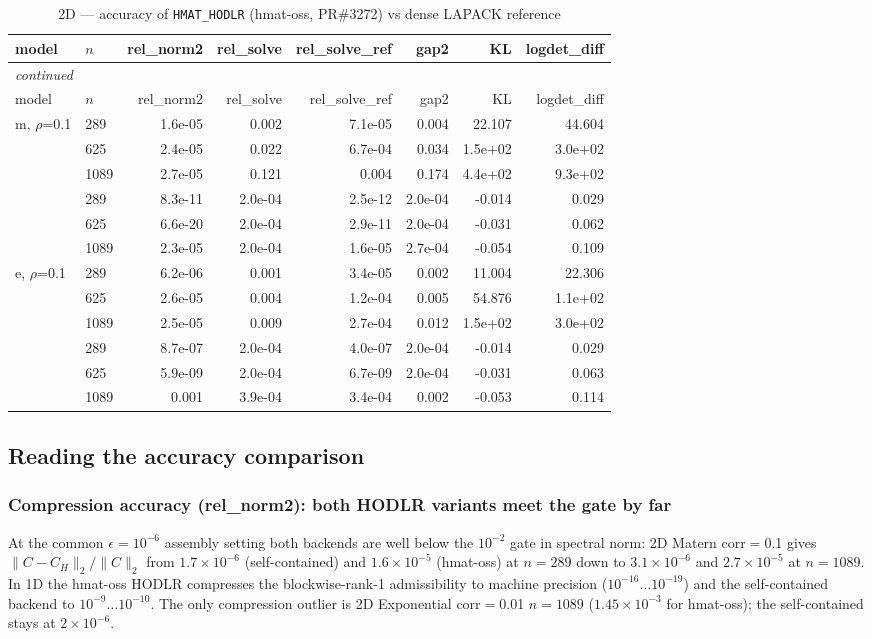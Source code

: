 \documentclass[11pt,a4paper]{article}
\begin{document}
\small\begin{center}
\begin{longtable}{llrrrrrr}
\caption{2D --- accuracy of \texttt{HMAT\_HODLR} (hmat-oss, PR\#3272) vs dense LAPACK reference}
\\\toprule
model & $n$ & rel\_norm2 & rel\_solve & rel\_solve\_ref & gap2 & KL & logdet\_diff\\
\midrule
\endfirsthead
\multicolumn{8}{l}{\small\emph{continued}}\\
\toprule
model & $n$ & rel\_norm2 & rel\_solve & rel\_solve\_ref & gap2 & KL & logdet\_diff\\
\midrule
\endhead

m, $\rho$=0.1 & 289 & 1.6e-05 & 0.002 & 7.1e-05 & 0.004 & 22.107 & 44.604\\
 & 625 & 2.4e-05 & 0.022 & 6.7e-04 & 0.034 & 1.5e+02 & 3.0e+02\\
 & 1089 & 2.7e-05 & 0.121 & 0.004 & 0.174 & 4.4e+02 & 9.3e+02\\
 & 289 & 8.3e-11 & 2.0e-04 & 2.5e-12 & 2.0e-04 & -0.014 & 0.029\\
 & 625 & 6.6e-20 & 2.0e-04 & 2.9e-11 & 2.0e-04 & -0.031 & 0.062\\
 & 1089 & 2.3e-05 & 2.0e-04 & 1.6e-05 & 2.7e-04 & -0.054 & 0.109\\
e, $\rho$=0.1 & 289 & 6.2e-06 & 0.001 & 3.4e-05 & 0.002 & 11.004 & 22.306\\
 & 625 & 2.6e-05 & 0.004 & 1.2e-04 & 0.005 & 54.876 & 1.1e+02\\
 & 1089 & 2.5e-05 & 0.009 & 2.7e-04 & 0.012 & 1.5e+02 & 3.0e+02\\
 & 289 & 8.7e-07 & 2.0e-04 & 4.0e-07 & 2.0e-04 & -0.014 & 0.029\\
 & 625 & 5.9e-09 & 2.0e-04 & 6.7e-09 & 2.0e-04 & -0.031 & 0.063\\
 & 1089 & 0.001 & 3.9e-04 & 3.4e-04 & 0.002 & -0.053 & 0.114\\
\bottomrule\end{longtable}\end{center}



\subsection{Reading the accuracy comparison}
\subsubsection*{Compression accuracy (rel\_norm2): both HODLR variants meet the
gate by far}
At the common $\epsilon{=}10^{-6}$ assembly setting both backends are well
below the $10^{-2}$ gate in spectral norm: 2D Matern corr$=$0.1 gives
$\|C-C_H\|_2/\|C\|_2$ from $1.7\times10^{-6}$ (self-contained) and
$1.6\times10^{-5}$ (hmat-oss) at $n{=}289$ down to $3.1\times10^{-6}$ and
$2.7\times10^{-5}$ at $n{=}1089$.  In 1D the hmat-oss HODLR compresses the
blockwise-rank-1 admissibility to machine precision
($10^{-16}\dots10^{-19}$) and the self-contained backend to
$10^{-9}\dots10^{-10}$.  The only compression outlier is 2D Exponential
corr$=$0.01 $n{=}1089$ ($1.45\times10^{-3}$ for hmat-oss); the self-contained
stays at $2\times10^{-6}$.
\end{document}
